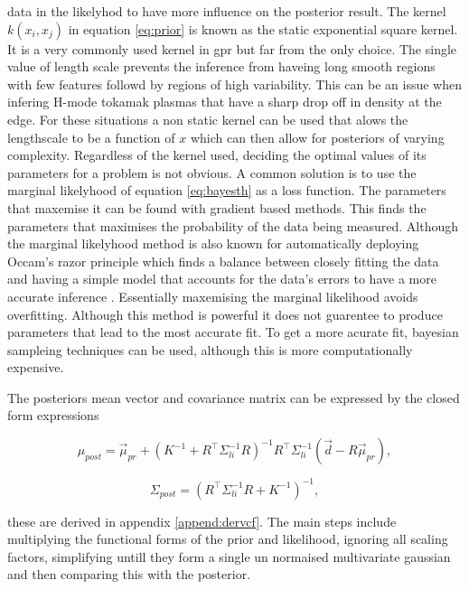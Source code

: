data in the likelyhod to have more influence on the posterior result. The kernel $k(x_i,x_j)$ in equation \ref{eq:prior} is known as the static exponential square kernel. It is a very commonly used kernel in \gls{gpr} but far from the only choice. The single value of length scale prevents the inference from haveing long smooth regions with few features followd by regions of high variability. This can be an issue when infering H-mode tokamak plasmas that have a sharp drop off in density at the edge. For these situations a non static kernel can be used that alows the lengthscale to be a function of $x$ which can then allow for posteriors of varying complexity. Regardless of the kernel used, deciding the optimal values of its parameters for a problem is not obvious. A common solution is to use the marginal likelyhood of equation \ref{eq:bayesth} as a loss function. The parameters that maxemise it can be found with gradient based methods. This finds the parameters that maximises the probability of the data being measured. Although the marginal likelyhood method is also known for automatically deploying Occam's razor principle which finds a balance between closely fitting the data and having a simple model that accounts for the data's errors to have a more accurate inference \cite{oscraz} \cite{gp4ml}. Essentially maxemising the marginal likelihood avoids overfitting. Although this method is powerful it does not guarentee to produce parameters that lead to the most accurate fit. To get a more acurate fit, bayesian sampleing techniques can be used, although this is more computationally expensive. 

The posteriors mean vector and covariance matrix can be expressed by the closed form expressions

\begin{equation}
\mu_{post}= \vec{\mu}_{pr} + (K^{-1} + R^{\top} \Sigma_{li}^{-1} R)^{-1} R^{\top} \Sigma_{li}^{-1} (\vec{d} - R \vec{\mu}_{pr}),
\end{equation}

\begin{equation}
\Sigma_{post} = \left(R^\top \Sigma_{li}^{-1} R + K^{-1}\right)^{-1},
\end{equation}

these are derived in appendix \ref{append:dervcf}. The main steps include multiplying the functional forms of the prior and likelihood, ignoring all scaling factors, simplifying untill they form a single un normaised multivariate gaussian and then comparing this with the posterior.

